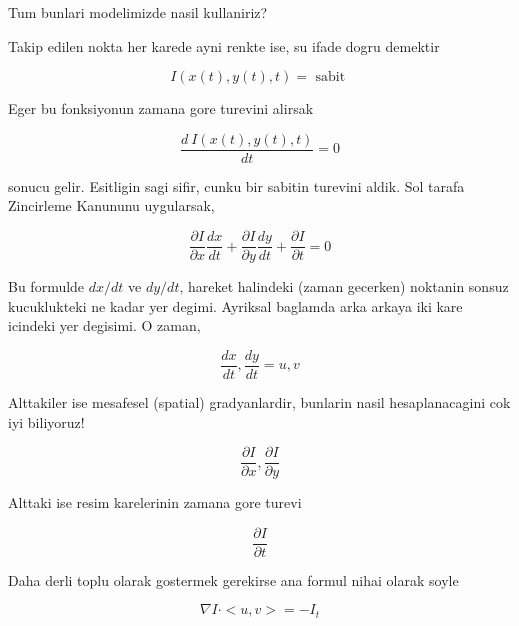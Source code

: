\documentclass[12pt,fleqn]{article}
\begin{document}
Tum bunlari modelimizde nasil kullaniriz? 

Takip edilen nokta her karede ayni renkte ise, su ifade dogru demektir 

\[ I(x(t),y(t),t) = \textrm{ sabit } \]

Eger bu fonksiyonun zamana gore turevini alirsak

\[ \frac{d \ I(x(t),y(t),t)}{dt} = 0\]

sonucu gelir. Esitligin sagi sifir, cunku bir sabitin turevini aldik. Sol
tarafa Zincirleme Kanununu uygularsak, 

\[ \frac{\partial I}{\partial x}\frac{dx}{dt} +
\frac{\partial I}{\partial y}\frac{dy}{dt} +
\frac{\partial I}{\partial t} = 0
\]

Bu formulde $dx/dt$ ve $dy/dt$, hareket halindeki (zaman gecerken) noktanin
sonsuz kucuklukteki ne kadar yer degimi. Ayriksal baglamda arka arkaya iki
kare icindeki yer degisimi. O zaman,

\[ \frac{dx}{dt}, \frac{dy}{dt} = u, v \]

Alttakiler ise mesafesel (spatial) gradyanlardir, bunlarin nasil
hesaplanacagini cok iyi biliyoruz! 

\[ 
\frac{\partial I}{\partial x}, \frac{\partial I}{\partial y}
 \]

Alttaki ise resim karelerinin zamana gore turevi

\[ 
\frac{\partial I}{\partial t}
 \]

Daha derli toplu olarak gostermek gerekirse ana formul nihai olarak soyle

\[ 
\nabla I \cdot <u, v> = -I_t
 \]





\end{document}
